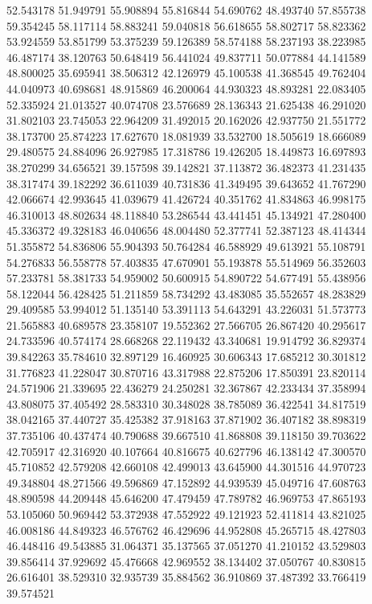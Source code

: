 52.543178
51.949791
55.908894
55.816844
54.690762
48.493740
57.855738
59.354245
58.117114
58.883241
59.040818
56.618655
58.802717
58.823362
53.924559
53.851799
53.375239
59.126389
58.574188
58.237193
38.223985
46.487174
38.120763
50.648419
56.441024
49.837711
50.077884
44.141589
48.800025
35.695941
38.506312
42.126979
45.100538
41.368545
49.762404
44.040973
40.698681
48.915869
46.200064
44.930323
48.893281
22.083405
52.335924
21.013527
40.074708
23.576689
28.136343
21.625438
46.291020
31.802103
23.745053
22.964209
31.492015
20.162026
42.937750
21.551772
38.173700
25.874223
17.627670
18.081939
33.532700
18.505619
18.666089
29.480575
24.884096
26.927985
17.318786
19.426205
18.449873
16.697893
38.270299
34.656521
39.157598
39.142821
37.113872
36.482373
41.231435
38.317474
39.182292
36.611039
40.731836
41.349495
39.643652
41.767290
42.066674
42.993645
41.039679
41.426724
40.351762
41.834863
46.998175
46.310013
48.802634
48.118840
53.286544
43.441451
45.134921
47.280400
45.336372
49.328183
46.040656
48.004480
52.377741
52.387123
48.414344
51.355872
54.836806
55.904393
50.764284
46.588929
49.613921
55.108791
54.276833
56.558778
57.403835
47.670901
55.193878
55.514969
56.352603
57.233781
58.381733
54.959002
50.600915
54.890722
54.677491
55.438956
58.122044
56.428425
51.211859
58.734292
43.483085
35.552657
48.283829
29.409585
53.994012
51.135140
53.391113
54.643291
43.226031
51.573773
21.565883
40.689578
23.358107
19.552362
27.566705
26.867420
40.295617
24.733596
40.574174
28.668268
22.119432
43.340681
19.914792
36.829374
39.842263
35.784610
32.897129
16.460925
30.606343
17.685212
30.301812
31.776823
41.228047
30.870716
43.317988
22.875206
17.850391
23.820114
24.571906
21.339695
22.436279
24.250281
32.367867
42.233434
37.358994
43.808075
37.405492
28.583310
30.348028
38.785089
36.422541
34.817519
38.042165
37.440727
35.425382
37.918163
37.871902
36.407182
38.898319
37.735106
40.437474
40.790688
39.667510
41.868808
39.118150
39.703622
42.705917
42.316920
40.107664
40.816675
40.627796
46.138142
47.300570
45.710852
42.579208
42.660108
42.499013
43.645900
44.301516
44.970723
49.348804
48.271566
49.596869
47.152892
44.939539
45.049716
47.608763
48.890598
44.209448
45.646200
47.479459
47.789782
46.969753
47.865193
53.105060
50.969442
53.372938
47.552922
49.121923
52.411814
43.821025
46.008186
44.849323
46.576762
46.429696
44.952808
45.265715
48.427803
46.448416
49.543885
31.064371
35.137565
37.051270
41.210152
43.529803
39.856414
37.929692
45.476668
42.969552
38.134402
37.050767
40.830815
26.616401
38.529310
32.935739
35.884562
36.910869
37.487392
33.766419
39.574521
